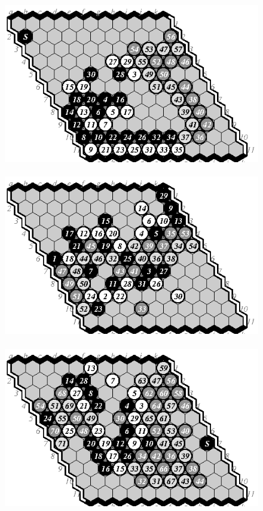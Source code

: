 \documentclass{IOS-Book-Article}
\begin{document}
\begin{figure}
\hspace*{-2cm}\
\includegraphics[scale=1]{pix/11.me4plus.eps}\hspace*{-1.5cm}\
\includegraphics[scale=1]{pix/11.me5plus.eps}\hspace*{-1.5cm}\
\includegraphics[scale=1]{pix/11.em6plus.eps}
\smallskip


\end{figure}
\end{document}
